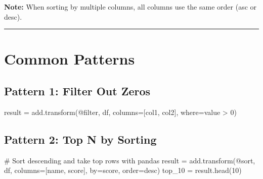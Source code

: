 \documentclass[
  letterpaper,
]{scrbook}
\newenvironment{Shaded}{\begin{snugshade}}{\end{snugshade}}
\newcommand{\CommentTok}[1]{\textcolor[rgb]{0.37,0.37,0.37}{#1}}
\newcommand{\DecValTok}[1]{\textcolor[rgb]{0.68,0.00,0.00}{#1}}
\newcommand{\NormalTok}[1]{\textcolor[rgb]{0.00,0.23,0.31}{#1}}
\newcommand{\OperatorTok}[1]{\textcolor[rgb]{0.37,0.37,0.37}{#1}}
\newcommand{\StringTok}[1]{\textcolor[rgb]{0.13,0.47,0.30}{#1}}
\begin{document}
\textbf{Note:} When sorting by multiple columns, all columns use the
same order (asc or desc).

\begin{center}\rule{0.5\linewidth}{0.5pt}\end{center}

\section{Common Patterns}\label{common-patterns-2}

\subsection{Pattern 1: Filter Out
Zeros}\label{pattern-1-filter-out-zeros}

\begin{Shaded}
\begin{Highlighting}[]
\NormalTok{result }\OperatorTok{=}\NormalTok{ add.transform(}\StringTok{\textquotesingle{}@filter\textquotesingle{}}\NormalTok{, df, columns}\OperatorTok{=}\NormalTok{[}\StringTok{\textquotesingle{}col1\textquotesingle{}}\NormalTok{, }\StringTok{\textquotesingle{}col2\textquotesingle{}}\NormalTok{], }
\NormalTok{                       where}\OperatorTok{=}\StringTok{\textquotesingle{}value \textgreater{} 0\textquotesingle{}}\NormalTok{)}
\end{Highlighting}
\end{Shaded}

\subsection{Pattern 2: Top N by
Sorting}\label{pattern-2-top-n-by-sorting}

\begin{Shaded}
\begin{Highlighting}[]
\CommentTok{\# Sort descending and take top rows with pandas}
\NormalTok{result }\OperatorTok{=}\NormalTok{ add.transform(}\StringTok{\textquotesingle{}@sort\textquotesingle{}}\NormalTok{, df, columns}\OperatorTok{=}\NormalTok{[}\StringTok{\textquotesingle{}name\textquotesingle{}}\NormalTok{, }\StringTok{\textquotesingle{}score\textquotesingle{}}\NormalTok{], }
\NormalTok{                       by}\OperatorTok{=}\StringTok{\textquotesingle{}score\textquotesingle{}}\NormalTok{, order}\OperatorTok{=}\StringTok{\textquotesingle{}desc\textquotesingle{}}\NormalTok{)}
\NormalTok{top\_10 }\OperatorTok{=}\NormalTok{ result.head(}\DecValTok{10}\NormalTok{)}
\end{Highlighting}
\end{Shaded}
\end{document}
